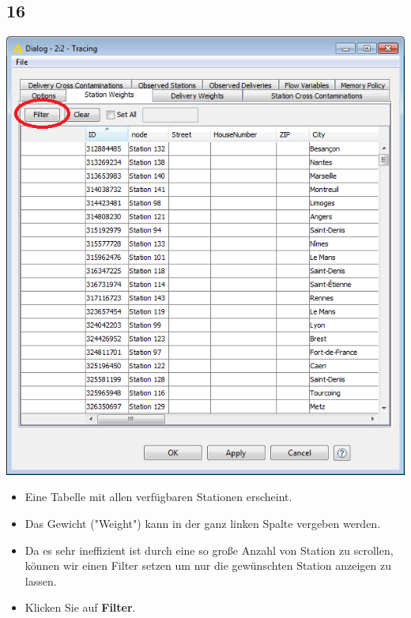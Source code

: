 \documentclass{beamer}
\begin{document}
\subsection{16}
\begin{frame}
	\begin{center}
  		\includegraphics[height=0.5\textheight]{16.png}
	\end{center}
	\begin{itemize}
		\item Eine Tabelle mit allen verfügbaren Stationen erscheint.
		\item Das Gewicht ("Weight") kann in der ganz linken Spalte vergeben werden.
		\item Da es sehr ineffizient ist durch eine so große Anzahl von Station zu scrollen, können wir einen Filter setzen um nur die gewünschten Station anzeigen zu lassen.
		\item Klicken Sie auf \textbf{Filter}.
	\end{itemize}
\end{frame}
\end{document}
